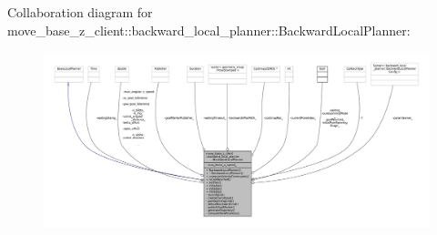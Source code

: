 Collaboration diagram for move\+\_\+base\+\_\+z\+\_\+client\+:\+:backward\+\_\+local\+\_\+planner\+:\+:Backward\+Local\+Planner\+:
\nopagebreak
\begin{figure}[H]
\begin{center}
\leavevmode
\includegraphics[width=350pt]{classmove__base__z__client_1_1backward__local__planner_1_1BackwardLocalPlanner__coll__graph}
\end{center}
\end{figure}
